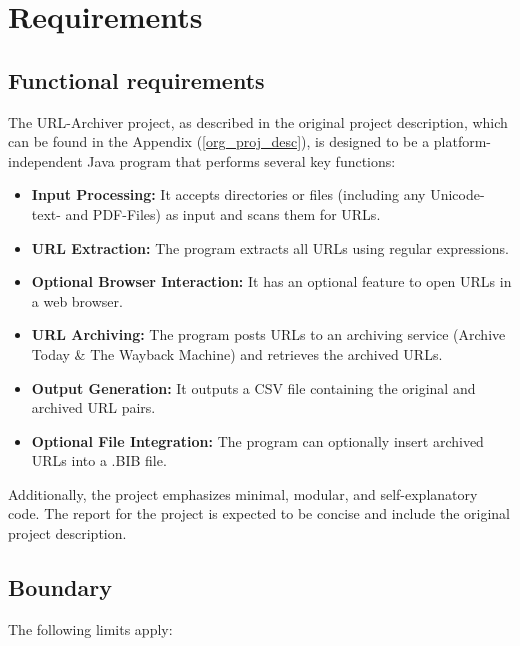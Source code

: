 \clearpage
\section{Requirements}

%
%
%
%
%
\subsection{Functional requirements}
The URL-Archiver project, as described in the original project description, which can be found in the Appendix (\ref{org_proj_desc}), is designed to be a platform-independent Java program that performs several key functions:

\begin{itemize}
    \item \textbf{Input Processing:} It accepts directories or files (including any Unicode-text- and PDF-Files) as input and scans them for URLs.
    \item \textbf{URL Extraction:} The program extracts all URLs using regular expressions.
    \item \textbf{Optional Browser Interaction:} It has an optional feature to open URLs in a web browser.
    \item \textbf{URL Archiving:} The program posts URLs to an archiving service (Archive Today \& The Wayback Machine) and retrieves the archived URLs.
    \item \textbf{Output Generation:} It outputs a CSV file containing the original and archived URL pairs.
    \item \textbf{Optional File Integration:} The program can optionally insert archived URLs into a .BIB file.
\end{itemize}

Additionally, the project emphasizes minimal, modular, and self-explanatory code. The report for the project is expected to be concise and include the original project description.

\subsection{Boundary}
The following limits apply:

